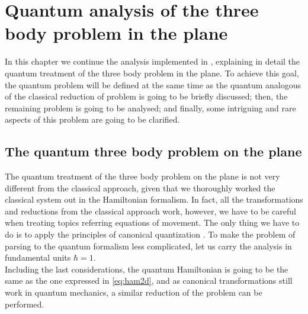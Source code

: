 \chapter{Quantum analysis of the three body problem in the plane}
In this chapter we continue the analysis implemented in \cite{alonso}, explaining in detail the quantum treatment of the three body problem in the plane. To achieve this goal, the quantum problem will be defined at the same time as the quantum analogous of the classical reduction of problem is going to be briefly discussed; then, the remaining problem is going to be analysed; and finally, some intriguing and rare aspects of this problem are going to be clarified.\\

\section{The quantum three body problem on the plane}
The quantum treatment of the three body problem on the plane is not very different from the classical approach, given that we thoroughly worked the classical system out in the Hamiltonian formalism. In fact, all the transformations and reductions from the classical approach work, however, we have to be careful when treating topics referring equations of movement.  The only thing we have to do is to apply the principles of canonical quantization \cite{Canonical quantization}. To make the problem of parsing to the quantum formalism less complicated, let us carry the analysis in fundamental units $\hbar =1$. \\

Including the last considerations, the quantum Hamiltonian is going to be the same as the one expressed in \eqref{eq:ham2d}, and as canonical transformations still work in quantum mechanics, a similar reduction of the problem can be performed.\\



